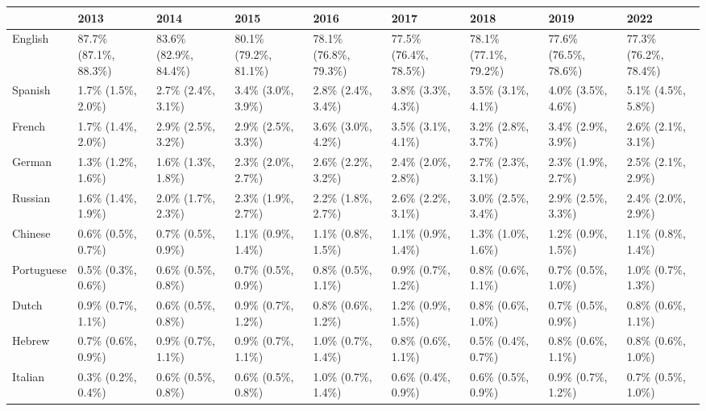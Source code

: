 \documentclass[
]{book}
\begin{document}
\begin{table}
\centering
\begin{tabular}[t]{>{}l|>{}l|>{}l|>{}l|>{}l|>{}l|>{}l|>{}l|>{}l}
\hline
  & 2013 & 2014 & 2015 & 2016 & 2017 & 2018 & 2019 & 2022\\
\hline
English & 87.7\% (87.1\%, 88.3\%) & 83.6\% (82.9\%, 84.4\%) & 80.1\% (79.2\%, 81.1\%) & 78.1\% (76.8\%, 79.3\%) & 77.5\% (76.4\%, 78.5\%) & 78.1\% (77.1\%, 79.2\%) & 77.6\% (76.5\%, 78.6\%) & 77.3\% (76.2\%, 78.4\%)\\
\hline
Spanish & 1.7\% (1.5\%, 2.0\%) & 2.7\% (2.4\%, 3.1\%) & 3.4\% (3.0\%, 3.9\%) & 2.8\% (2.4\%, 3.4\%) & 3.8\% (3.3\%, 4.3\%) & 3.5\% (3.1\%, 4.1\%) & 4.0\% (3.5\%, 4.6\%) & 5.1\% (4.5\%, 5.8\%)\\
\hline
French & 1.7\% (1.4\%, 2.0\%) & 2.9\% (2.5\%, 3.2\%) & 2.9\% (2.5\%, 3.3\%) & 3.6\% (3.0\%, 4.2\%) & 3.5\% (3.1\%, 4.1\%) & 3.2\% (2.8\%, 3.7\%) & 3.4\% (2.9\%, 3.9\%) & 2.6\% (2.1\%, 3.1\%)\\
\hline
German & 1.3\% (1.2\%, 1.6\%) & 1.6\% (1.3\%, 1.8\%) & 2.3\% (2.0\%, 2.7\%) & 2.6\% (2.2\%, 3.2\%) & 2.4\% (2.0\%, 2.8\%) & 2.7\% (2.3\%, 3.1\%) & 2.3\% (1.9\%, 2.7\%) & 2.5\% (2.1\%, 2.9\%)\\
\hline
Russian & 1.6\% (1.4\%, 1.9\%) & 2.0\% (1.7\%, 2.3\%) & 2.3\% (1.9\%, 2.7\%) & 2.2\% (1.8\%, 2.7\%) & 2.6\% (2.2\%, 3.1\%) & 3.0\% (2.5\%, 3.4\%) & 2.9\% (2.5\%, 3.3\%) & 2.4\% (2.0\%, 2.9\%)\\
\hline
Chinese & 0.6\% (0.5\%, 0.7\%) & 0.7\% (0.5\%, 0.9\%) & 1.1\% (0.9\%, 1.4\%) & 1.1\% (0.8\%, 1.5\%) & 1.1\% (0.9\%, 1.4\%) & 1.3\% (1.0\%, 1.6\%) & 1.2\% (0.9\%, 1.5\%) & 1.1\% (0.8\%, 1.4\%)\\
\hline
Portuguese & 0.5\% (0.3\%, 0.6\%) & 0.6\% (0.5\%, 0.8\%) & 0.7\% (0.5\%, 0.9\%) & 0.8\% (0.5\%, 1.1\%) & 0.9\% (0.7\%, 1.2\%) & 0.8\% (0.6\%, 1.1\%) & 0.7\% (0.5\%, 1.0\%) & 1.0\% (0.7\%, 1.3\%)\\
\hline
Dutch & 0.9\% (0.7\%, 1.1\%) & 0.6\% (0.5\%, 0.8\%) & 0.9\% (0.7\%, 1.2\%) & 0.8\% (0.6\%, 1.2\%) & 1.2\% (0.9\%, 1.5\%) & 0.8\% (0.6\%, 1.0\%) & 0.7\% (0.5\%, 0.9\%) & 0.8\% (0.6\%, 1.1\%)\\
\hline
Hebrew & 0.7\% (0.6\%, 0.9\%) & 0.9\% (0.7\%, 1.1\%) & 0.9\% (0.7\%, 1.1\%) & 1.0\% (0.7\%, 1.4\%) & 0.8\% (0.6\%, 1.1\%) & 0.5\% (0.4\%, 0.7\%) & 0.8\% (0.6\%, 1.1\%) & 0.8\% (0.6\%, 1.0\%)\\
\hline
Italian & 0.3\% (0.2\%, 0.4\%) & 0.6\% (0.5\%, 0.8\%) & 0.6\% (0.5\%, 0.8\%) & 1.0\% (0.7\%, 1.4\%) & 0.6\% (0.4\%, 0.9\%) & 0.6\% (0.5\%, 0.9\%) & 0.9\% (0.7\%, 1.2\%) & 0.7\% (0.5\%, 1.0\%)\\

\end{tabular}
\end{table}
\end{document}
